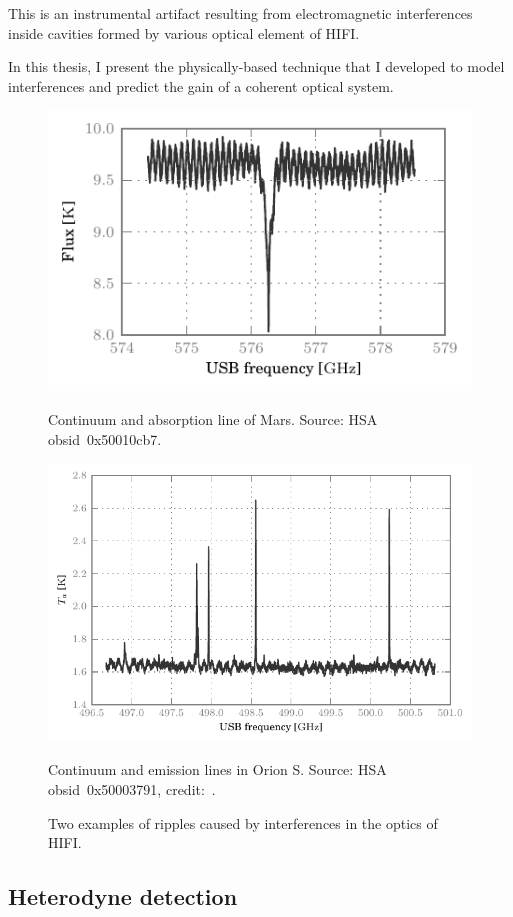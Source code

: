 This is an instrumental artifact resulting from electromagnetic interferences inside cavities formed by various optical element of HIFI.

In this thesis, I present the physically-based technique that I developed to model interferences and predict the gain of a coherent optical system.

\begin{figure}[bp]
    \centering
    \includegraphics[width=.8\textwidth]{mars_50010cb7_WBSH_USB}
    \caption*{Continuum and absorption line of Mars.
              Source: HSA obsid~0x50010cb7.
    }
    \bigskip
    \includegraphics[width=.8\textwidth]{50003791_00}
    \caption*{Continuum and emission lines in Orion S.
       Source: HSA obsid~0x50003791, credit:~\textcite{goldsmith2011herschel}.}
    \caption{Two examples of ripples caused by interferences in the optics of HIFI.}
    \label{fig:ripples}
\end{figure}



\subsection{Heterodyne detection}

